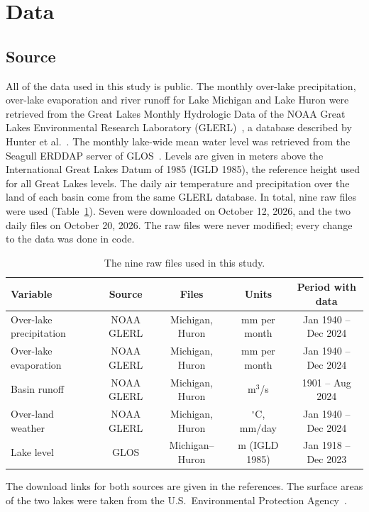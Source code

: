 \documentclass{article}
\begin{document}
\section{Data}
\label{sec:data}

\subsection{Source}

All of the data used in this study is public. The monthly over-lake precipitation, over-lake
evaporation and river runoff for Lake Michigan and Lake Huron were retrieved from the Great Lakes
Monthly Hydrologic Data of the NOAA Great Lakes Environmental Research Laboratory
(GLERL)~\cite{glerl}, a database described by Hunter et al.~\cite{hunter2015}. The monthly
lake-wide mean water level was retrieved from the Seagull ERDDAP server of GLOS~\cite{glos}.
Levels are given in meters above the International Great Lakes Datum of 1985 (IGLD 1985), the
reference height used for all Great Lakes levels. The daily air temperature and precipitation
over the land of each basin come from the same GLERL database. In total, nine raw files were used
(Table~\ref{tab:data}). Seven were downloaded on October 12, 2026, and the two daily files on
October 20, 2026. The raw files were never modified; every change to the data was done in code.

\begin{table}[htbp]
\centering
\caption{The nine raw files used in this study.}
\label{tab:data}
\begin{tabular}{||l|c|c|c|c||}
\hline\hline
Variable & Source & Files & Units & Period with data \\
\hline\hline
Over-lake precipitation & NOAA GLERL & Michigan, Huron & mm per month & Jan 1940 -- Dec 2024 \\
Over-lake evaporation & NOAA GLERL & Michigan, Huron & mm per month & Jan 1940 -- Dec 2024 \\
Basin runoff & NOAA GLERL & Michigan, Huron & m$^3$/s & 1901 -- Aug 2024 \\
Over-land weather & NOAA GLERL & Michigan, Huron & $^\circ$C, mm/day & Jan 1940 -- Dec 2024 \\
Lake level & GLOS & Michigan--Huron & m (IGLD 1985) & Jan 1918 -- Dec 2023 \\
\hline\hline
\end{tabular}
\end{table}

The download links for both sources are given in the references. The surface areas of the two
lakes were taken from the U.S.\ Environmental Protection Agency~\cite{epa}.
\end{document}
